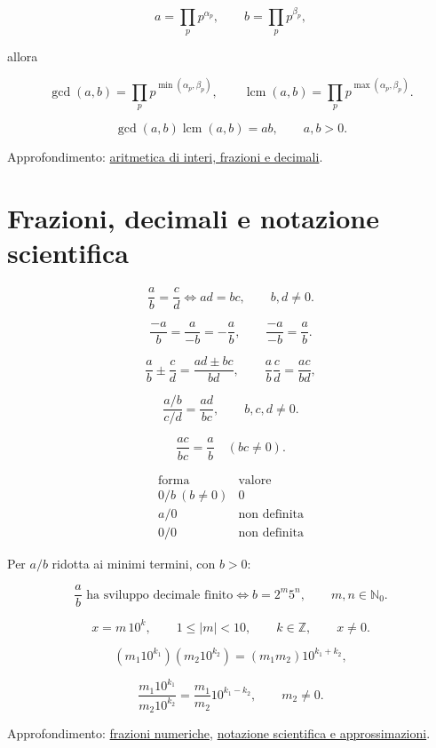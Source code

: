 \[
a=\prod_p p^{\alpha_p},
\qquad
b=\prod_p p^{\beta_p},
\]

allora

\[
\gcd(a,b)=\prod_p p^{\min(\alpha_p,\beta_p)},
\qquad
\operatorname{lcm}(a,b)=\prod_p p^{\max(\alpha_p,\beta_p)}.
\]

\[
\gcd(a,b)\operatorname{lcm}(a,b)=ab,
\qquad a,b>0.
\]

Approfondimento: \href{https://ingegnerismo.it/matematica/aritmetica-interi-frazioni-decimali/}{aritmetica di interi, frazioni e decimali}.

\section{Frazioni, decimali e notazione scientifica}\label{frazioni-decimali-e-notazione-scientifica}

\[
\frac ab=\frac cd
\Longleftrightarrow
ad=bc,
\qquad b,d\ne0.
\]

\[
\frac{-a}{b}=\frac{a}{-b}=-\frac ab,
\qquad
\frac{-a}{-b}=\frac ab.
\]

\[
\frac ab\pm\frac cd=\frac{ad\pm bc}{bd},
\qquad
\frac ab\frac cd=\frac{ac}{bd},
\]

\[
\frac{a/b}{c/d}=\frac{ad}{bc},
\qquad
b,c,d\ne0.
\]

\[
\frac{ac}{bc}=\frac ab\quad(bc\ne0).
\]

\[
\begin{array}{c|c}
\text{forma}&\text{valore}\\
\hline
0/b\ (b\ne0)&0\\
a/0&\text{non definita}\\
0/0&\text{non definita}
\end{array}
\]

Per \(a/b\) ridotta ai minimi termini, con \(b>0\):

\[
\frac ab\text{ ha sviluppo decimale finito}
\Longleftrightarrow
b=2^m5^n,
\qquad m,n\in\mathbb N_0.
\]

\[
x=m\,10^k,
\qquad
1\le|m|<10,
\qquad
k\in\mathbb Z,
\qquad x\ne0.
\]

\[
(m_1 10^{k_1})(m_2 10^{k_2})=(m_1m_2)10^{k_1+k_2},
\]

\[
\frac{m_1 10^{k_1}}{m_2 10^{k_2}}
=\frac{m_1}{m_2}10^{k_1-k_2},
\qquad m_2\ne0.
\]

Approfondimento: \href{https://ingegnerismo.it/matematica/frazioni-numeriche/}{frazioni numeriche}, \href{https://ingegnerismo.it/matematica/notazione-scientifica-approssimazioni/}{notazione scientifica e approssimazioni}.

